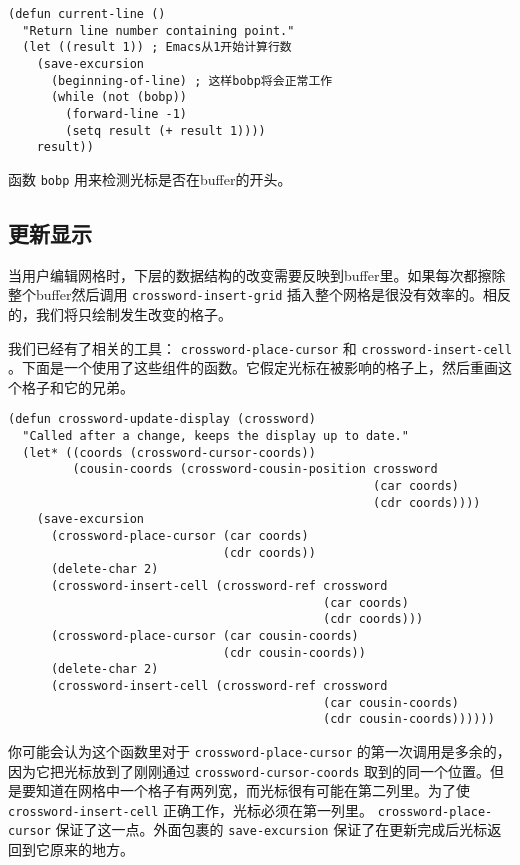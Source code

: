 \begin{verbatim}
(defun current-line ()
  "Return line number containing point."
  (let ((result 1)) ; Emacs从1开始计算行数
    (save-excursion
      (beginning-of-line) ; 这样bobp将会正常工作
      (while (not (bobp))
        (forward-line -1)
        (setq result (+ result 1))))
    result))
\end{verbatim}

函数 \texttt{bobp} 用来检测光标是否在buffer的开头。

\subsection{更新显示}
\label{section:10-Updating-the-Display}

当用户编辑网格时，下层的数据结构的改变需要反映到buffer里。如果每次都擦除整个buffer然后调用 \texttt{crossword-insert-grid} 插入整个网格是很没有效率的。相反的，我们将只绘制发生改变的格子。

我们已经有了相关的工具： \texttt{crossword-place-cursor} 和 \texttt{crossword-insert-cell} 。下面是一个使用了这些组件的函数。它假定光标在被影响的格子上，然后重画这个格子和它的兄弟。

\begin{verbatim}
(defun crossword-update-display (crossword)
  "Called after a change, keeps the display up to date."
  (let* ((coords (crossword-cursor-coords))
         (cousin-coords (crossword-cousin-position crossword
                                                   (car coords)
                                                   (cdr coords))))
    (save-excursion
      (crossword-place-cursor (car coords)
                              (cdr coords))
      (delete-char 2)
      (crossword-insert-cell (crossword-ref crossword
                                            (car coords)
                                            (cdr coords)))
      (crossword-place-cursor (car cousin-coords)
                              (cdr cousin-coords))
      (delete-char 2)
      (crossword-insert-cell (crossword-ref crossword
                                            (car cousin-coords)
                                            (cdr cousin-coords))))))
\end{verbatim}

你可能会认为这个函数里对于 \texttt{crossword-place-cursor} 的第一次调用是多余的，因为它把光标放到了刚刚通过 \texttt{crossword-cursor-coords} 取到的同一个位置。但是要知道在网格中一个格子有两列宽，而光标很有可能在第二列里。为了使 \texttt{crossword-insert-cell} 正确工作，光标必须在第一列里。 \texttt{crossword-place-cursor} 保证了这一点。外面包裹的 \texttt{save-excursion} 保证了在更新完成后光标返回到它原来的地方。

